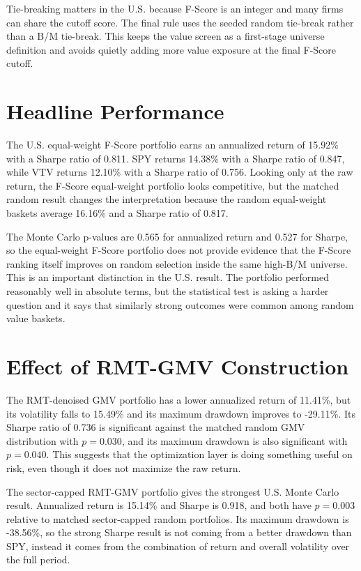 \documentclass[11pt,a4paper]{report}
\numberwithin{figure}{chapter}
\numberwithin{table}{chapter}
\numberwithin{equation}{chapter}
\begin{document}
Tie-breaking matters in the U.S. because F-Score is an integer and many firms can share the cutoff score. The final rule uses the seeded random tie-break rather than a B/M tie-break. This keeps the value screen as a first-stage universe definition and avoids quietly adding more value exposure at the final F-Score cutoff.

\section{Headline Performance}

The U.S. equal-weight F-Score portfolio earns an annualized return of 15.92\% with a Sharpe ratio of 0.811. SPY returns 14.38\% with a Sharpe ratio of 0.847, while VTV returns 12.10\% with a Sharpe ratio of 0.756. Looking only at the raw return, the F-Score equal-weight portfolio looks competitive, but the matched random result changes the interpretation because the random equal-weight baskets average 16.16\% and a Sharpe ratio of 0.817.

The Monte Carlo p-values are 0.565 for annualized return and 0.527 for Sharpe, so the equal-weight F-Score portfolio does not provide evidence that the F-Score ranking itself improves on random selection inside the same high-B/M universe. This is an important distinction in the U.S. result. The portfolio performed reasonably well in absolute terms, but the statistical test is asking a harder question and it says that similarly strong outcomes were common among random value baskets.

\section{Effect of RMT-GMV Construction}

The RMT-denoised GMV portfolio has a lower annualized return of 11.41\%, but its volatility falls to 15.49\% and its maximum drawdown improves to -29.11\%. Its Sharpe ratio of 0.736 is significant against the matched random GMV distribution with $p=0.030$, and its maximum drawdown is also significant with $p=0.040$. This suggests that the optimization layer is doing something useful on risk, even though it does not maximize the raw return.

The sector-capped RMT-GMV portfolio gives the strongest U.S. Monte Carlo result. Annualized return is 15.14\% and Sharpe is 0.918, and both have $p=0.003$ relative to matched sector-capped random portfolios. Its maximum drawdown is -38.56\%, so the strong Sharpe result is not coming from a better drawdown than SPY, instead it comes from the combination of return and overall volatility over the full period.
\end{document}
